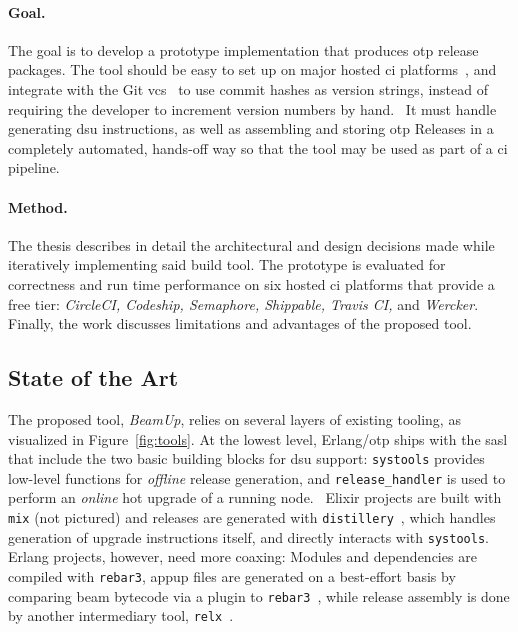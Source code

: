\paragraph{Goal.} The goal is to develop a prototype implementation that produces \acrshort{otp} release packages. The tool should be easy to set up on major hosted \acrfull{ci} platforms~\cite{dig2016usage}, and integrate with the Git \acrfull{vcs}~\cite{sink2011version} to use commit hashes as version strings, instead of requiring the developer to increment version numbers by hand.~\cite{maste2016} It must handle generating \acrshort{dsu} instructions, as well as assembling and storing \acrshort{otp} Releases in a completely automated, hands-off way so that the tool may be used as part of a \acrshort{ci} pipeline.

\paragraph{Method.} The thesis describes in detail the architectural and design decisions made while iteratively implementing said build tool. The prototype is evaluated for correctness and run time performance on six hosted \acrshort{ci} platforms that provide a free tier: \emph{CircleCI, Codeship, Semaphore, Shippable, Travis CI,} and \emph{Wercker}. Finally, the work discusses limitations and advantages of the proposed tool.

\cleardoublepage
\subsection{State of the Art}\label{sec:sota}

The proposed tool, \emph{BeamUp}, relies on several layers of existing tooling, as visualized in Figure~\ref{fig:tools}. At the lowest level, Erlang/\acrshort{otp} ships with the \acrfull{sasl} that include the two basic building blocks for \acrshort{dsu} support: \lstinline|systools| provides low-level functions for \emph{offline} release generation, and \lstinline|release_handler| is used to perform an \emph{online} hot upgrade of a running node.~\cite{doc:otp}
Elixir projects are built with \lstinline|mix| (not pictured) and releases are generated with \lstinline|distillery|~\cite{distillery}, which handles generation of upgrade instructions itself, and directly interacts with \lstinline|systools|. Erlang projects, however, need more coaxing: Modules and dependencies are compiled with \lstinline|rebar3|, \acrfull{appup} files are generated on a best-effort basis by comparing \acrshort{beam} bytecode via a plugin to \lstinline|rebar3|~\cite{rebar3appup}, while release assembly is done by another intermediary tool, \lstinline|relx|~\cite{loder2016production}.

